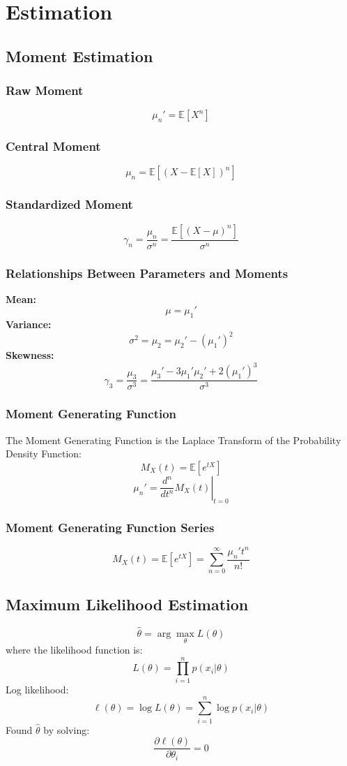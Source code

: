 \documentclass{article}
\begin{document}
\newpage
\section{Estimation}

\subsection{Moment Estimation}

\subsubsection{Raw Moment}
\[
    \mu_n' = \mathbb{E}[X^n]
\]

\subsubsection{Central Moment}
\[
    \mu_n = \mathbb{E}[(X - \mathbb{E}[X])^n]
\]

\subsubsection{Standardized Moment}
\[
    \gamma_n = \frac{\mu_n}{\sigma^n} = \frac{\mathbb{E}[(X - \mu)^n]}{\sigma^n}
\]

\subsubsection{Relationships Between Parameters and Moments}
\textbf{Mean:}
\[
    \mu = \mu_1'
\]
\textbf{Variance:}
\[
    \sigma^2 = \mu_2 = \mu_2' - (\mu_1')^2
\]
\textbf{Skewness:}
\[
    \gamma_3 = \frac{\mu_3}{\sigma^3} = \frac{\mu_3' - 3\mu_1'\mu_2' + 2(\mu_1')^3}{\sigma^3}
\]

\subsubsection{Moment Generating Function}
The Moment Generating Function is the Laplace Transform of the Probability Density Function:
\[
    M_X(t) = \mathbb{E}[e^{tX}]
\]
\[
    \mu_n' = \left.\frac{d^n}{dt^n} M_X(t)\right|_{t=0}
\]

\subsubsection{Moment Generating Function Series}
\[
    M_X(t) = \mathbb{E}[e^{tX}] = \sum_{n=0}^{\infty} \frac{\mu_n' t^n}{n!}
\]

\subsection{Maximum Likelihood Estimation}
\[
    \hat{\theta} = \arg\max_\theta L(\theta)
\]
where the likelihood function is:
\[
    L(\theta) = \prod_{i=1}^{n} p(x_i|\theta)
\]
Log likelihood:
\[
    \ell(\theta) = \log L(\theta) = \sum_{i=1}^{n} \log p(x_i|\theta)
\]
Found $\hat{\theta}$ by solving:
\[
    \frac{\partial \ell(\theta)}{\partial \theta_i} = 0
\]
\end{document}
